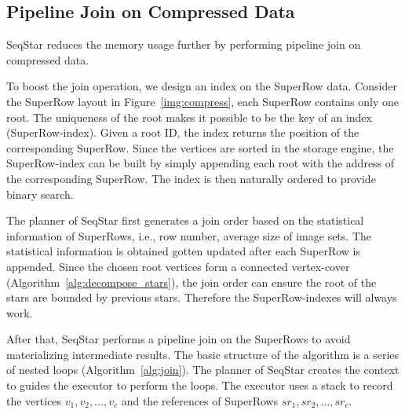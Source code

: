 \subsection{Pipeline Join on Compressed Data}\label{sec:match_join}
SeqStar reduces the memory usage further by performing pipeline join on compressed data.

To boost the join operation, we design an index on the SuperRow data.
Consider the SuperRow layout in Figure~\ref{img:compress}, each SuperRow contains only one root.
The uniqueness of the root makes it possible to be the key of an index (SuperRow-index).
Given a root ID, the index returns the position of the corresponding SuperRow.
Since the vertices are sorted in the storage engine, the SuperRow-index can be built by simply appending each root with the address of the corresponding SuperRow. The index is then naturally ordered to provide binary search.


The planner of SeqStar first generates a join order based on the statistical information of SuperRows,
i.e., row number, average size of image sets.
The statistical information is obtained gotten updated after each SuperRow is appended.
Since the chosen root vertices form a connected vertex-cover (Algorithm~\ref{alg:decompose_stars}),
the join order can ensure the root of the stars are bounded by previous stars.
Therefore the SuperRow-indexes will always work.

After that, SeqStar performs a pipeline join on the SuperRows to avoid materializing intermediate results.
The basic structure of the algorithm is a series of nested loops  (Algorithm~\ref{alg:join}).
The planner of SeqStar creates the context to guides the executor to perform the loops.
The executor uses a stack to record the vertices $v_1, v_2, \dots, v_c$ and the references of SuperRows $sr_1, sr_2, \dots, sr_c$.

